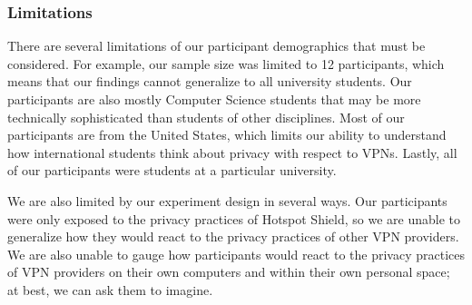 \subsubsection{Limitations}
There are several limitations of our participant demographics that must be considered.
For example, our sample size was limited to 12 participants, which means that our findings cannot generalize to all university students.
Our participants are also mostly Computer Science students that may be more technically sophisticated than students of other disciplines.
Most of our participants are from the United States, which limits our ability to understand how international students think about privacy with respect to VPNs.
Lastly, all of our participants were students at a particular university.

We are also limited by our experiment design in several ways.
Our participants were only exposed to the privacy practices of Hotspot Shield, so we are unable to generalize how they would react to the privacy practices of other VPN providers.
We are also unable to gauge how participants would react to the privacy practices of VPN providers on their own computers and within their own personal space; at best, we can ask them to imagine.